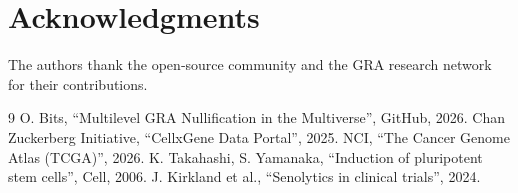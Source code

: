 \documentclass[12pt,a4paper]{article}
\begin{document}
\section*{Acknowledgments}
The authors thank the open‑source community and the GRA research network for their contributions.

\begin{thebibliography}{9}
 O. Bits, “Multilevel GRA Nullification in the Multiverse”, GitHub, 2026.
 Chan Zuckerberg Initiative, “CellxGene Data Portal”, 2025.
 NCI, “The Cancer Genome Atlas (TCGA)”, 2026.
 K. Takahashi, S. Yamanaka, “Induction of pluripotent stem cells”, Cell, 2006.
 J. Kirkland et al., “Senolytics in clinical trials”, 2024.
\end{thebibliography}
\end{document}
